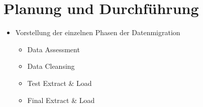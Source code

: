 \section{Planung und Durchführung}

\begin{itemize}
	\item Vorstellung der einzelnen Phasen der Datenmigration
	\begin{itemize}
		\item Data Assessment
		
		\item Data Cleansing
		
		\item Test Extract \& Load
		
		\item Final Extract \& Load
		

\end{itemize}
\end{itemize}
